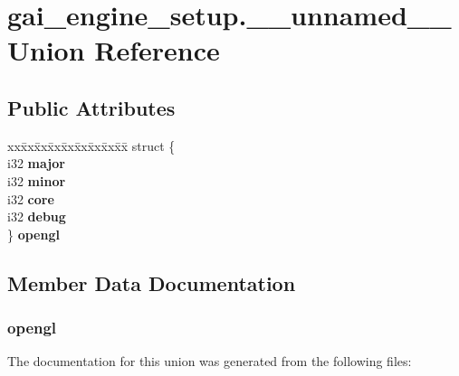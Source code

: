 \hypertarget{uniongai__engine__setup_8____unnamed____}{}\section{gai\+\_\+engine\+\_\+setup.\+\_\+\+\_\+unnamed\+\_\+\+\_\+ Union Reference}
\label{uniongai__engine__setup_8____unnamed____}
\subsection*{Public Attributes}
\begin{DoxyCompactItemize}
\item 
\mbox{\label{uniongai__engine__setup_8____unnamed_____a6785e6b975db5d7cf223101ef1bc2f6f}} 
\begin{tabbing}
xx\=xx\=xx\=xx\=xx\=xx\=xx\=xx\=xx\=\kill
struct \{\\
\mbox{\label{structgai__engine__setup_1_1_0D20_1_1_0D22_adee746fb694c45f01126ea2706b9bbc5}} 
i32 {\bfseries major}\\
\mbox{\label{structgai__engine__setup_1_1_0D20_1_1_0D22_aaab4b80635264db989253dee98ea5b2e}} 
i32 {\bfseries minor}\\
\mbox{\label{structgai__engine__setup_1_1_0D20_1_1_0D22_aa3acd90eebdceffcf9a2dac135a87ac5}} 
i32 {\bfseries core}\\
\mbox{\label{structgai__engine__setup_1_1_0D20_1_1_0D22_abc2cf2c6535db8b38e544a2e00779aa5}} 
i32 {\bfseries debug}\\
\} {\bfseries opengl}\\

\end{tabbing}\end{DoxyCompactItemize}


\subsection{Member Data Documentation}
\mbox{\label{uniongai__engine__setup_8____unnamed_____a6785e6b975db5d7cf223101ef1bc2f6f}} 
\subsubsection{\texorpdfstring{opengl}{opengl}}
{\footnotesize\ttfamily }



The documentation for this union was generated from the following files\+: